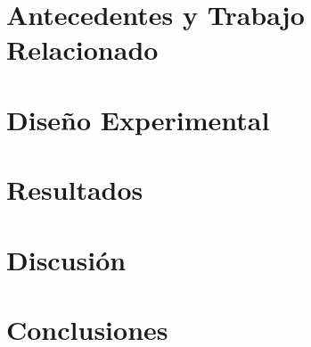 \documentclass[runningheads]{llncs}
\begin{document}
\section{Antecedentes y Trabajo Relacionado}
\label{sec:background}


%
\section{Dise\~no Experimental}
\label{sec:design}


%
\section{Resultados}
\label{sec:results}


%
\section{Discusi\'on}
\label{sec:discussion}


%
\section{Conclusiones}
\label{sec:conclusions}

\end{document}
